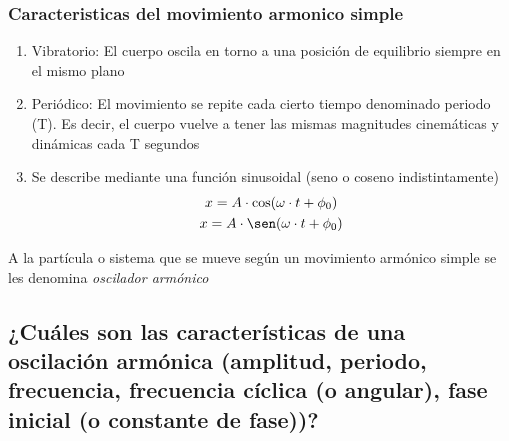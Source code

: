 \documentclass[twocolumn, 12pt]{article}
\begin{document}
\subsubsection{Caracteristicas del movimiento armonico simple}

\begin{enumerate}
    \item Vibratorio: El cuerpo oscila en torno a una posición de
          equilibrio siempre en el mismo plano

    \item Periódico: El movimiento se repite cada cierto tiempo
          denominado periodo (T). Es decir, el cuerpo vuelve a tener
          las mismas magnitudes cinemáticas y dinámicas cada T
          segundos

    \item Se describe mediante una función sinusoidal (seno o coseno
          indistintamente) {\large
                  \begin{equation}
                      \begin{gathered}
                          x = A \cdot \cos(\omega \cdot t + \phi_0) \\
                          x = A \cdot \sen(\omega \cdot t + \phi_0) \\
                      \end{gathered}
                  \end{equation}
              }
\end{enumerate}

A la partícula o sistema que se mueve según un movimiento
armónico simple se les denomina \textit{oscilador armónico}

\nocite{movimiento-armonico-simple}

\subsection{¿Cuáles son las características de una oscilación armónica (amplitud, periodo, frecuencia,
    frecuencia cíclica (o angular), fase inicial (o constante de fase))?}
\end{document}
